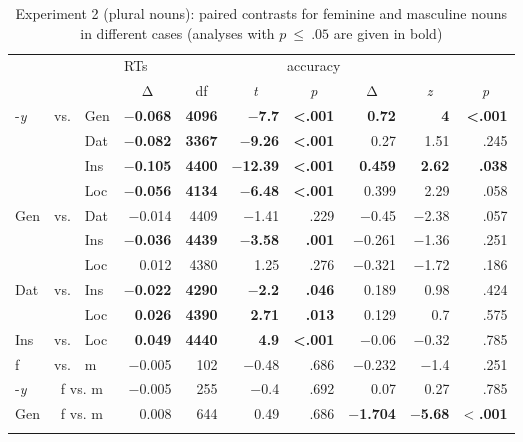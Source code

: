 \documentclass[output=paper, modfonts,newtxmath,hidelinks]{langscibook}
\begin{document}
\begin{table}
\centering
\caption{Experiment 2 (plural nouns): paired contrasts for feminine and masculine nouns in different cases (analyses with $p~\leq~.05$ are given in bold)}
\label{tab:casePlComparisons}
 \begin{tabular}{*{3}l*{7}r} 
  \lsptoprule
  	\multicolumn{3}{l}{}	&	\multicolumn{4}{c}{RTs}	&	\multicolumn{3}{c}{accuracy}\\
  	\cline{4-10}
 	\multicolumn{3}{l}{}	&	\multicolumn{1}{c}{Δ} 	& \multicolumn{1}{c}{df}	&   \multicolumn{1}{c}{\textit{t}}	&	\multicolumn{1}{c}{\textit{p}}	&	\multicolumn{1}{c}{Δ} & \multicolumn{1}{c}{\textit{z}}	& \multicolumn{1}{c}{\textit{p}}	\\
  \midrule
    -\textit{y}	&	vs.	&	Gen	&	\textbf{$-$0.068}	&	\textbf{4096}	& 	\textbf{$-$7.7}	&	\textbf{<.001}	& 	\textbf{0.72}	& 	\textbf{4}	& 	\textbf{<.001}	\\
	~&	~	&	Dat	&	\textbf{$-$0.082}	&	\textbf{3367}	& 	\textbf{$-$9.26}	&	\textbf{<.001}	& 		0.27		& 		1.51		& 		.245		\\
	~&	~	&	Ins	&	\textbf{$-$0.105}	&	\textbf{4400}	& 	\textbf{$-$12.39}	&	\textbf{<.001}	& 	\textbf{0.459}	& 	\textbf{2.62}	& 	\textbf{.038}	\\
	~&	~	&	Loc	&	\textbf{$-$0.056}	&	\textbf{4134}	& 	\textbf{$-$6.48}	&	\textbf{<.001}	& 	0.399	& 		2.29		& 		.058		\\
    Gen	&	vs.	&	Dat	&		$-$0.014		&		4409		& 		$-$1.41		&		.229		& 		$-$0.45		& 		$-$2.38		& 		.057	\\
	~&	~	&	Ins	&	\textbf{$-$0.036}	&	\textbf{4439}	& 	\textbf{$-$3.58}	&	\textbf{.001}	& 		$-$0.261		& 		$-$1.36		& 		.251		\\
	~&	~	&	Loc	&		0.012		&		4380		& 		1.25		&		.276		& 		$-$0.321		& 		$-$1.72		& 		.186	\\
    Dat	&	vs.	&	Ins	&	\textbf{$-$0.022}	&	\textbf{4290}	& 	\textbf{$-$2.2}	&	\textbf{.046}	& 		0.189		& 		0.98		& 		.424		\\
	~&	~	&	Loc	&	\textbf{0.026}	&	\textbf{4390}	& 	\textbf{2.71}	&	\textbf{.013}	& 		0.129		& 		0.7		& 		.575	\\
    Ins	&	vs.	&	Loc	&	\textbf{0.049}	&	\textbf{4440}	& 	\textbf{4.9}	&	\textbf{<.001}	& 		$-$0.06		& 		$-$0.32		& 		.785		\\
    \midrule
    f &	vs. & 	m &	$-$0.005 &	102	& $-$0.48	& .686 &	$-$0.232 &	$-$1.4 &	.251\\
    \midrule
    -\textit{y} & \multicolumn{2}{c}{f vs. m} & $-$0.005 &    255 & $-$0.4  & .692 &	0.07   &   0.27   & .785\\
    Gen &  \multicolumn{2}{c}{f vs. m}   &   0.008   &   644 &   0.49    & .686  &  \textbf{ $-$1.704 } &   \textbf{$-$5.68}  & < \textbf{.001}\\

  \lspbottomrule	
 \end{tabular}
\end{table}

\sloppy
\printbibliography[heading=subbibliography,notkeyword=this]
\end{document}
